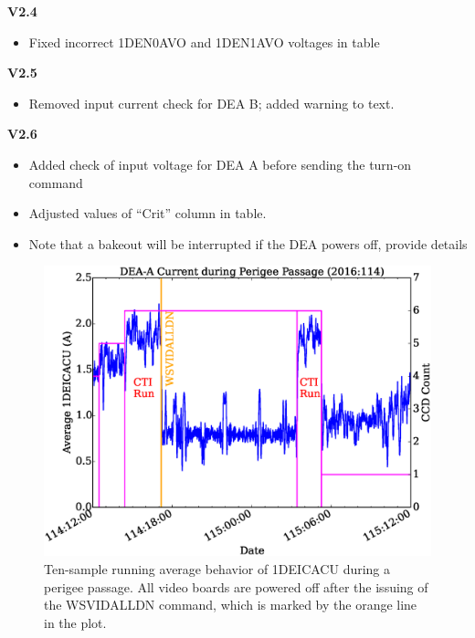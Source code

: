 \documentclass[11pt]{article}
\begin{document}
{\bf V2.4}
\begin{itemize}
\item Fixed incorrect 1DEN0AVO and 1DEN1AVO voltages in table
\end{itemize}

{\bf V2.5}
\begin{itemize}
\item Removed input current check for DEA B; added warning to text.
\end{itemize}

{\bf V2.6}
\begin{itemize}
\item Added check of input voltage for DEA A before sending the turn-on command
\item Adjusted values of ``Crit'' column in table. 
\item Note that a bakeout will be interrupted if the DEA powers off, provide details
\end{itemize}

\begin{landscape}
\begin{figure}
\begin{center}
\includegraphics[width=1.2\textwidth]{deaa_on_fig1.eps}
\caption{Ten-sample running average behavior of 1DEICACU during a perigee passage. All video boards
are powered off after the issuing of the WSVIDALLDN command, which is marked by
the orange line in the plot.}
\end{center}
\end{figure}
\end{landscape}
\end{document}
